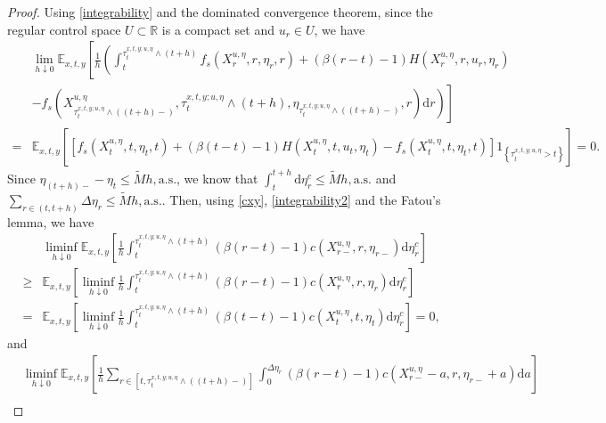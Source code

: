 \documentclass[10pt,a4paper]{amsart}
\begin{document}
\begin{proof}
Using \eqref{integrability} and the dominated convergence theorem, since the regular control space $U\subset\mathbb{R}$ is a compact set and $u_r\in U$, we have 
\begin{equation}\begin{aligned}
&\lim\limits_{h\downarrow 0}\mathbb{E}_{x,t,y}\left[\frac{1}{h}\left(\int_{t}^{\tau^{x,t,y;u,\eta}_{t}\wedge(t+h)}f_s\left(X^{u,\eta}_{r},r,\eta_{r},r\right)+(\beta(r-t)-1) H\left(X^{u,\eta}_r, r,u_r, \eta_r \right) \right.\right.\\
  &\left.\left.-f_s\left(X^{u,\eta}_{\tau^{x,t,y;u,\eta}_{t}\wedge((t+h)-)},\tau^{x,t,y;u,\eta}_{t}\wedge(t+h),\eta_{\tau^{x,t,y;u,\eta}_{t}\wedge((t+h)-)},r\right)\mathrm{d}r\right)\right]\\
=&\mathbb{E}_{x,t,y}\left[\left[f_s\left(X^{u,\eta}_{t},t,\eta_{t},t\right)+ (\beta(t-t)-1)H\left(X^{u,\eta}_t, t,u_t, \eta_t \right)-f_s\left(X^{u,\eta}_{t},t,\eta_{t},t\right)\right]1_{\left\{\tau^{x,t,y;u,\eta}_{t}>t\right\}} \right]=0.
\end{aligned}\label{est1}\end{equation}
Since $\eta_{(t+h)-}-\eta_{t}\le \tilde{M}h, \text{a.s.}$, we know that $\int_{t}^{t+h}\mathrm{d}\eta^{c}_{r}\le \tilde{M}h, \text{a.s.}$ and $\sum\limits_{r\in(t,t+h)}\Delta\eta_{r}\le \tilde{M}h, \text{a.s.}$. Then, using \eqref{cxy}, \eqref{integrability2} and the Fatou's lemma, we have
\begin{equation}\begin{aligned}
&\liminf\limits_{h\downarrow 0}\mathbb{E}_{x,t,y}\left[\frac{1}{h}\int_{t}^{\tau^{x,t,y;u,\eta}_{t}\wedge(t+h)}\left(\beta(r-t)-1\right) c\left(X^{u,\eta}_{r-}, r, \eta_{r-}\right) \mathrm{d}\eta^{c}_r\right]\\
\geq&\mathbb{E}_{x,t,y}\left[\liminf\limits_{h\downarrow 0}\frac{1}{h}\int_{t}^{\tau^{x,t,y;u,\eta}_{t}\wedge(t+h)}\left(\beta(r-t)-1\right) c\left(X^{u,\eta}_{r}, r, \eta_{r}\right)\mathrm{d}\eta^{c}_r \right]\\
=&\mathbb{E}_{x,t,y}\left[ \liminf\limits_{h\downarrow 0}\frac{1}{h}\int_{t}^{\tau^{x,t,y;u,\eta}_{t}\wedge(t+h)}\left(\beta(t-t)-1\right) c(X^{u,\eta}_t, t, \eta_t)\mathrm{d}\eta^{c}_{r}\right]= 0,
\end{aligned}\label{est2}\end{equation}
and
\begin{equation}\begin{aligned}
&\liminf\limits_{h\downarrow 0}\mathbb{E}_{x,t,y}\left[\frac{1}{h}\sum\limits_{r\in[t,\tau^{x,t,y;u,\eta}_{t}\wedge((t+h)-)]}\int_{0}^{\Delta\eta_{r}}\left(\beta(r-t)-1\right) c\left(X^{u,\eta}_{r-}-a, r, \eta_{r-}+a\right)\mathrm{d}a\right]\\

\end{aligned}
\end{equation}
\end{proof}
\end{document}

